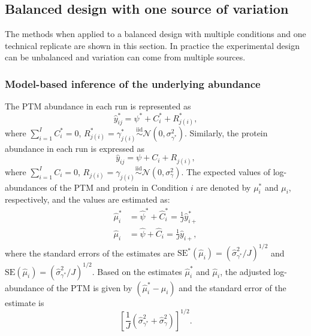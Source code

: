 \documentclass{mcp}
\begin{document}
\subsection{Balanced design with one source of variation}
\label{sec:model}
The methods when applied to a balanced design with multiple conditions and one technical replicate are shown in this section. In practice the experimental design can be unbalanced and variation can come from multiple sources.

\subsubsection{Model-based inference of the underlying abundance}
\label{sec:infer}

The PTM abundance in each run is represented as 
\[
\hat{y}_{ij}^{\ast} = \psi^{\ast} + C_{i}^{\ast} + R_{j(i)}^{\ast},
\]
where $\sum_{i=1}^{I} C_{i}^{\ast} = 0$, $R_{j(i)}^{\ast} = \gamma_{j(i)}^{\ast} \stackrel{\text{iid}}{\sim} \mathcal{N}(0, \sigma_{\gamma^{\ast}}^{2})$. 
Similarly, the protein abundance in each run is expressed as
\[
\hat{y}_{ij} = \psi + C_{i} + R_{j(i)},
\]
where $\sum_{i=1}^{I} C_{i} = 0$, $R_{j(i)} = \gamma_{j(i)} \stackrel{\text{iid}}{\sim} \mathcal{N}(0, \sigma_{\gamma}^{2})$. The expected values of log-abundances of the PTM and protein in Condition $i$ are denoted by $\mu_{i}^{\ast}$ and $\mu_{i}$, respectively, and the values are estimated as: 
\begin{align*}
\hat{\mu}_{i}^{\ast} &= \hat{\psi}^{\ast} + \hat{C}_{i}^{\ast} = \frac{1}{J} \hat{y}_{i+}^{\ast} \\
\hat{\mu}_{i} &= \hat{\psi} + \hat{C}_{i} = \frac{1}{J} \hat{y}_{i+},
\end{align*}
where the standard errors of the estimates are $\mathrm{SE^{\ast}}(\hat{\mu}_{i}) = (\hat{\sigma}_{\gamma^{\ast}}^{2} / J)^{1/2}$ and $\mathrm{SE}(\hat{\mu}_{i}) = (\hat{\sigma}_{\gamma^{\ast}}^{2} / J)^{1/2}$.
Based on the estimates $\hat{\mu}_{i}^{\ast}$ and $\hat{\mu}_{i}$, the adjusted log-abundance of the PTM is given by $(\hat{\mu}_{i}^{\ast} - \hat{\mu}_{i})$ and the standard error of the estimate is 
\[
\left[ \frac{1}{J} \left( \hat{\sigma}_{\gamma^{\ast}}^{2} + \hat{\sigma}_{\gamma}^{2} \right) \right]^{1/2}.
\]
\end{document}

